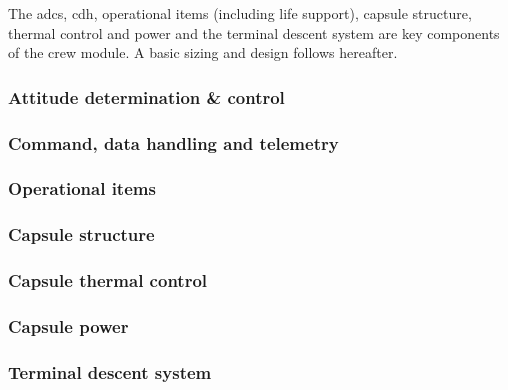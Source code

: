 The \acrfull{adcs}, \acrfull{cdh}, operational items (including life support), capsule structure, thermal control and power and the terminal descent system are key components of the crew module. A basic sizing and design follows hereafter.

\subsubsection{Attitude determination \& control} \label{subsec:adcs}


\subsubsection{Command, data handling and telemetry} \label{subsec:cdh}


\subsubsection{Operational items} \label{subsec:crewop}


\subsubsection{Capsule structure} \label{subsec:crewstruc}


\subsubsection{Capsule thermal control} \label{subsec:crewthermalcontrol}


\subsubsection{Capsule power} \label{subsec:pwer}


\subsubsection{Terminal descent system} \label{subsec:crewtermdescent}





